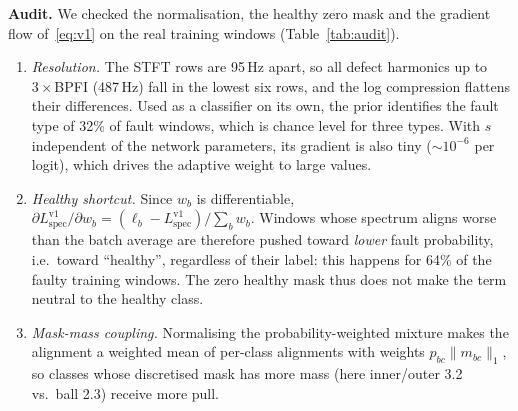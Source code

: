 \documentclass[conference]{IEEEtran}
\newcommand{\Lspec}{L_{\mathrm{spec}}}
\begin{document}
\textbf{Audit.} We checked the normalisation, the healthy zero mask and the
gradient flow of~\eqref{eq:v1} on the real training windows
(Table~\ref{tab:audit}).
\begin{enumerate}
\item \emph{Resolution.} The STFT rows are 95\,Hz apart, so all defect
harmonics up to $3\times$BPFI (487\,Hz) fall in the lowest six rows, and the
log compression flattens their differences. Used as a classifier on its own,
the prior identifies the fault type of 32\% of fault windows, which is chance level
for three types. With $s$ independent of the network parameters, its gradient is
also tiny ($\sim10^{-6}$ per logit), which drives the adaptive weight to
large values.
\item \emph{Healthy shortcut.} Since $w_b$ is differentiable,
$\partial\Lspec^{\mathrm{v1}}/\partial w_b=(\ell_b-\Lspec^{\mathrm{v1}})/\sum_b w_b$.
Windows whose spectrum aligns worse than the batch average are therefore
pushed toward \emph{lower} fault probability, i.e.\ toward ``healthy'',
regardless of their label: this happens for 64\% of the faulty training
windows. The zero healthy mask thus does not make the term neutral to the
healthy class.
\item \emph{Mask-mass coupling.} Normalising the probability-weighted mixture
makes the alignment a weighted mean of per-class alignments with weights
$p_{bc}\lVert m_{bc}\rVert_1$, so classes whose discretised mask has more mass
(here inner/outer 3.2 vs.\ ball 2.3) receive more pull.
\end{enumerate}
\end{document}
